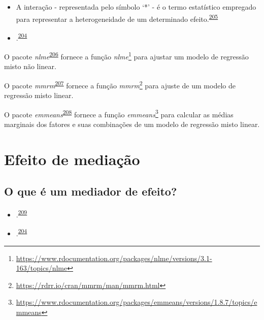 \documentclass[
  a4paper,
]{book}
\renewcommand{\href}[2]{#2\footnote{\url{#1}}}
\newenvironment{infobox}[1]
  {
  \begin{itemize}
  \renewcommand{\labelitemi}{
    \raisebox{-.7\height}[0pt][0pt]{
      {\setkeys{Gin}{width=3em,keepaspectratio}
        \texttt{[image: \#1]}}
    }
  }
  \setlength{\fboxsep}{1em}
  \begin{blackbox}
  \item
  }
  {
  \end{blackbox}
  \end{itemize}
  }
\begin{document}
\begin{itemize}
\item
  A interação - representada pelo símbolo `*' - é o termo estatístico empregado para representar a heterogeneidade de um determinado efeito.\textsuperscript{\protect\hyperlink{ref-Altman1996}{205}}
\item
  .\textsuperscript{\protect\hyperlink{ref-Bours2023}{204}}
\end{itemize}

\begin{infobox}{images/Rlogo}
O pacote \emph{nlme}\textsuperscript{\protect\hyperlink{ref-nlme}{206}} fornece a função \href{https://www.rdocumentation.org/packages/nlme/versions/3.1-163/topics/nlme}{\emph{nlme}} para ajustar um modelo de regressão misto não linear.

\end{infobox}

\begin{infobox}{images/Rlogo}
O pacote \emph{mmrm}\textsuperscript{\protect\hyperlink{ref-mmrm}{207}} fornece a função \href{https://rdrr.io/cran/mmrm/man/mmrm.html}{\emph{mmrm}} para ajuste de um modelo de regressão misto linear.

\end{infobox}

\begin{infobox}{images/Rlogo}
O pacote \emph{emmeans}\textsuperscript{\protect\hyperlink{ref-emmeans}{208}} fornece a função \href{https://www.rdocumentation.org/packages/emmeans/versions/1.8.7/topics/emmeans}{\emph{emmeans}} para calcular as médias marginais dos fatores e suas combinações de um modelo de regressão misto linear.

\end{infobox}

\hypertarget{mediacao}{%
\section{Efeito de mediação}\label{mediacao}}

\hypertarget{o-que-uxe9-um-mediador-de-efeito}{%
\subsection{O que é um mediador de efeito?}\label{o-que-uxe9-um-mediador-de-efeito}}

\begin{itemize}
\item
  .\textsuperscript{\protect\hyperlink{ref-Baron1986}{209}}
\item
  .\textsuperscript{\protect\hyperlink{ref-Bours2023}{204}}
\end{itemize}
\end{document}
